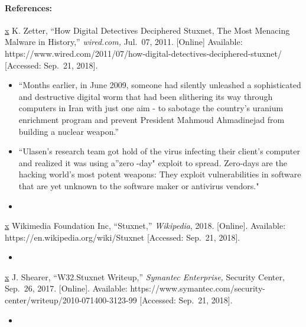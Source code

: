 \documentclass[11pt]{article}
\begin{document}
    \hypertarget{references}{%
\paragraph{References:}\label{references}}

\href{https://www.ted.com/talks/ralph_langner_cracking_stuxnet_a_21st_century_cyberweapon}{x}
K. Zetter, ``How Digital Detectives Deciphered Stuxnet, The Most
Menacing Malware in History,'' \emph{wired.com,} Jul.~07, 2011.
{[}Online{]} Available:
https://www.wired.com/2011/07/how-digital-detectives-deciphered-stuxnet/
{[}Accessed: Sep.~21, 2018{]}.

\begin{itemize}
\item
  ``Months earlier, in June 2009, someone had silently unleashed a
  sophisticated and destructive digital worm that had been slithering
  its way through computers in Iran with just one aim - to sabotage the
  country's uranium enrichment program and prevent President Mahmoud
  Ahmadinejad from building a nuclear weapon.''
\item
  ``Ulasen's research team got hold of the virus infecting their
  client's computer and realized it was using a''zero -day" exploit to
  spread. Zero-days are the hacking world's most potent weapons: They
  exploit vulnerabilities in software that are yet unknown to the
  software maker or antivirus vendors."
\item
\end{itemize}

\href{https://www.ted.com/talks/ralph_langner_cracking_stuxnet_a_21st_century_cyberweapon}{x}
Wikimedia Foundation Inc, ``Stuxnet,'' \emph{Wikipedia}, 2018.
{[}Online{]}. Available: https://en.wikipedia.org/wiki/Stuxnet
{[}Accessed: Sep.~21, 2018{]}.

\begin{itemize}
\item
\end{itemize}

\href{https://www.ted.com/talks/ralph_langner_cracking_stuxnet_a_21st_century_cyberweapon}{x}
J. Shearer, ``W32.Stuxnet Writeup,'' \emph{Symantec Enterprise,}
Security Center, Sep.~26, 2017. {[}Online{]}. Available:
https://www.symantec.com/security-center/writeup/2010-071400-3123-99
{[}Accessed: Sep.~21, 2018{]}.

\begin{itemize}
\item
\end{itemize}
\end{document}
